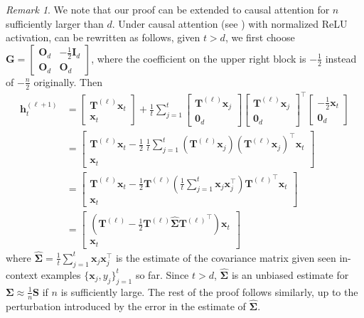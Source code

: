 \documentclass[11pt]{article}
\theoremstyle{plain}
\theoremstyle{definition}
\theoremstyle{remark}
\newtheorem{remark}[theorem]{Remark}
\newcommand{\zero}{\boldsymbol{0}}
\renewcommand{\^}[1]{^{(#1)}}
\newcommand{\bx}{\boldsymbol{x}}
\newcommand{\bh}{\boldsymbol{h}}
\newcommand{\bG}{\boldsymbol{G}}
\newcommand{\bO}{\boldsymbol{O}}
\newcommand{\bI}{\boldsymbol{I}}
\newcommand{\bS}{\boldsymbol{S}}
\newcommand{\bT}{\boldsymbol{T}}
\newcommand{\bSigma}{\boldsymbol{\Sigma}}
\begin{document}
{
\begin{remark}
\label{rmk:causal}
We note that our proof can be extended to causal attention for $n$ sufficiently larger than $d$. Under causal attention (see ) with normalized ReLU activation,  can be rewritten as follows, given $t > d$, we first choose $\bG = \begin{bmatrix}
        \bO_d & -\frac{1}{2} \bI_d \\
        \bO_d & \bO_d 
    \end{bmatrix}$, where the coefficient on the upper right block is $-\frac{1}{2}$ instead of $-\frac{n}{2}$ originally. Then
\begin{equation}
    \begin{aligned}
        \bh_t^{(\ell+1)} &= \begin{bmatrix}
        \bT^{(\ell)} \bx_t \\ \bx_t 
    \end{bmatrix} + \frac{1}{t} \sum_{j=1}^t \begin{bmatrix}
        \bT^{(\ell)} \bx_j \\ \zero_d 
    \end{bmatrix} \begin{bmatrix}
        \bT^{(\ell)} \bx_j \\ \zero_d 
    \end{bmatrix}^\top  \begin{bmatrix}
         -\frac{1}{2} \bx_t \\ \zero_d 
    \end{bmatrix} \\
    &= \begin{bmatrix}
        \bT^{(\ell)} \bx_t - \frac{1}{2}~ \frac{1}{t}\sum_{j=1}^t  (\bT^{(\ell)} \bx_j) (\bT^{(\ell)} \bx_j)^\top  \bx_t \\ \bx_t  
    \end{bmatrix} \\
    &= \begin{bmatrix}
        \bT^{(\ell)} \bx_t - \frac{1}{2} \bT^{(\ell)} \left(\frac{1}{t}\sum_{j=1}^t \bx_j  \bx_j^\top\right)  {\bT^{(\ell)}}^\top \bx_t \\ \bx_t  
    \end{bmatrix} \\
    &= \begin{bmatrix}
        \left(\bT^{(\ell)} - \frac{1}{2} \bT^{(\ell)} \hat{\bSigma} {\bT^{(\ell)}}^\top \right) \bx_t \\ \bx_t 
    \end{bmatrix}
    \end{aligned}
\end{equation}
where $\hat{\bSigma} = \frac{1}{t}\sum_{j=1}^t \bx_j  \bx_j^\top$ is the estimate of the covariance matrix given seen in-context examples $\{\bx_j, y_j\}_{j=1}^t$ so far. Since $t > d$, $\hat{\bSigma}$ is an unbiased estimate for $\bSigma \approx \frac{1}{n} \bS$ if $n$ is sufficiently large. The rest of the proof follows similarly, up to the perturbation introduced by the error in the estimate of $\hat{\bSigma}$. 


\end{remark}}
\end{document}
